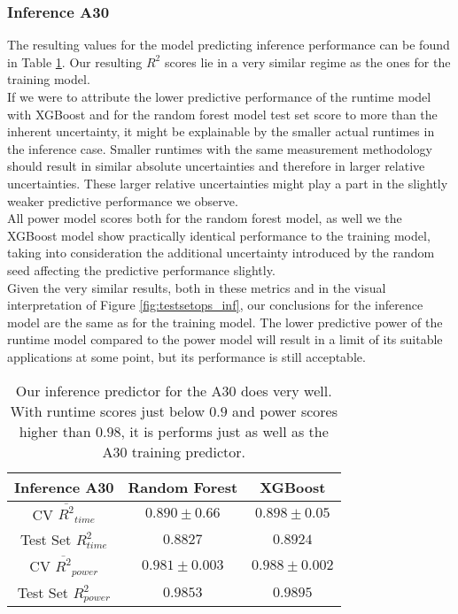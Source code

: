 \subsubsection{Inference A30}

The resulting values for the model predicting inference performance can be found in Table \ref{tab:pred_res_inf}. Our resulting $R^2$ scores lie in a very similar regime as the ones for the training model. \\
If we were to attribute the lower predictive performance of the runtime model with XGBoost and for the random forest model test set score to more than the inherent uncertainty, it might be explainable by the smaller actual runtimes in the inference case. Smaller runtimes with the same measurement methodology should result in similar absolute uncertainties and therefore in larger relative uncertainties. These larger relative uncertainties might play a part in the slightly weaker predictive performance we observe.\\
All power model scores both for the random forest model, as well we the XGBoost model show practically identical performance to the training model, taking into consideration the additional uncertainty introduced by the random seed affecting the predictive performance slightly. \\
Given the very similar results, both in these metrics and in the visual interpretation of Figure \ref{fig:testsetops_inf}, our conclusions for the inference model are the same as for the training model. The lower predictive power of the runtime model compared to the power model will result in a limit of its suitable applications at some point, but its performance is still acceptable. 



\begin{table}[h!]
\centering
\begin{tabular}{|c|c|c|}
\hline
 \textbf{Inference A30}& \textbf{Random Forest} & \textbf{XGBoost} \\
\hline
CV $\overline{R^2}_{time}$ & $0.890 \pm 0.66$ &  $0.898 \pm 0.05$ \\
\hline
Test Set $R^2_{time}$ & $0.8827$ & $0.8924$ \\
\hline
CV $\overline{R^2}_{power}$ & $0.981 \pm 0.003$  &  $0.988 \pm 0.002$\\
\hline
Test Set $R^2_{power}$ & $0.9853$ & $0.9895$ \\
\hline
\end{tabular}
\caption{Our inference predictor for the A30 does very well. With runtime scores just below $0.9$ and power scores higher than $0.98$, it is performs just as well as the A30 training predictor. }
\label{tab:pred_res_inf}
\end{table}



